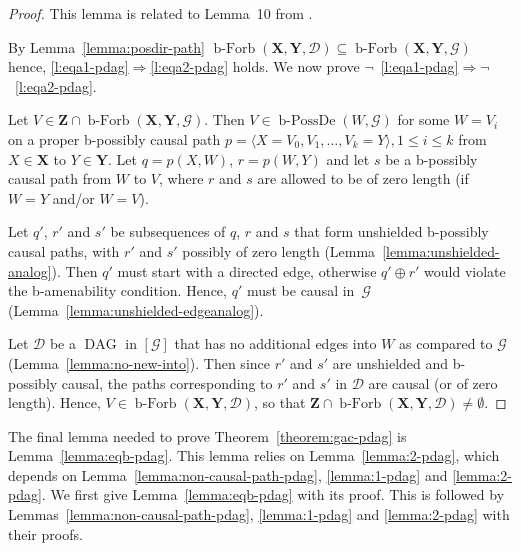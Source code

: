 \documentclass[letterpaper]{article}
\theoremstyle{definition}
\theoremstyle{remark}
\DeclareMathOperator{\DAG}{DAG}
\DeclareMathOperator{\bPossDe}{b-PossDe}
\DeclareMathOperator{\bForbb}{b-Forb}
\newcommand{\bamen}{the b-amenability condition}
\newcommand{\g}[1][G]{\mathcal{#1}}
\newcommand{\bfb}[2][X,Y]{\bForbb(\mathbf{#1},#2)}
\begin{document}
\begin{proof}
This lemma is related to Lemma~10 from \cite{perkovic16}.

 By Lemma~\ref{lemma:posdir-path} $\bfb{\g[D]} \subseteq \bfb{\g}$ hence, \ref{l:eqa1-pdag}$\Rightarrow$\ref{l:eqa2-pdag} holds. We now prove $\neg$~\ref{l:eqa1-pdag}$\Rightarrow\neg$~\ref{l:eqa2-pdag}.

Let $V \in \mathbf{Z} \cap \bfb{\g}$. Then $V \in \bPossDe(W,\g)$ for some $W= V_i$ on a proper b-possibly causal path $p = \langle X=V_0, V_1,\dots, V_k=Y \rangle, 1 \le i \le k$ from $X \in \mathbf{X}$ to $Y \in \mathbf{Y}$. Let $q=p(X,W)$, $r=p(W,Y)$ and let $s$ be a b-possibly causal path from $W$ to $V$, where $r$ and $s$ are allowed to be of zero length (if $W=Y$ and/or $W=V$). 

   Let $q'$, $r'$ and $s'$ be subsequences of $q$, $r$ and $s$ that form unshielded b-possibly causal paths, with $r'$ and $s'$ possibly of zero length (Lemma~\ref{lemma:unshielded-analog}). Then $q'$ must start with a directed edge, otherwise $q' \oplus r'$ would violate \bamen{}.
 Hence, $q'$ must be causal in~$\g$ (Lemma~\ref{lemma:unshielded-edgeanalog}). 

   Let $\g[D]$ be a $\DAG$ in $[\g]$ that has no additional edges into $W$ as compared to $\g$ (Lemma~\ref{lemma:no-new-into}). Then since $r'$ and $s'$ are unshielded and b-possibly causal, the paths corresponding to $r'$ and $s'$ in $\g[D]$ are causal (or of zero length). Hence,  $V \in \bfb{\g[D]}$, so that $\mathbf{Z} \cap \bfb{\g[D]} \neq \emptyset$.
\end{proof}
The final lemma needed to prove Theorem~\ref{theorem:gac-pdag} is Lemma~\ref{lemma:eqb-pdag}. This lemma relies on Lemma~\ref{lemma:2-pdag}, which depends on Lemma~\ref{lemma:non-causal-path-pdag}, \ref{lemma:1-pdag} and \ref{lemma:2-pdag}. We first give Lemma~\ref{lemma:eqb-pdag} with its proof. This is followed by Lemmas~\ref{lemma:non-causal-path-pdag}, \ref{lemma:1-pdag} and \ref{lemma:2-pdag} with their proofs. 
\end{document}

